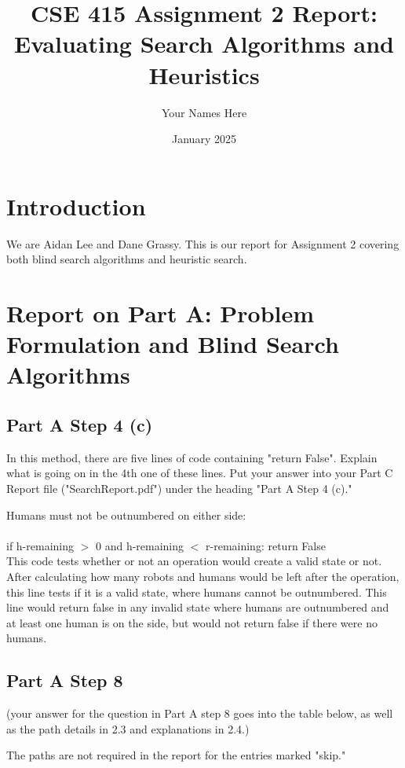 \documentclass{article}
\title{CSE 415 Assignment 2 Report: \\
Evaluating Search Algorithms and Heuristics}
\author{Your Names Here }
\date{January 2025}
\begin{document}
\maketitle

\section{Introduction}
We are Aidan Lee and Dane Grassy. 
This is our report for Assignment 2 covering both blind search algorithms
and heuristic search.

\section{Report on Part A: Problem Formulation and Blind Search Algorithms}

\subsection{Part A Step 4 (c)}
In this method, there are five lines of code containing "return False". Explain what is going on in the 4th one of these lines. Put your answer into your Part C Report file ("SearchReport.pdf") under the heading "Part A Step 4 (c)."

Humans must not be outnumbered on either side:
\\
\\ if h-remaining $>$ 0 and h-remaining $<$ r-remaining: return False
\\ This code tests whether or not an operation would create a valid state or not. After calculating how many robots and humans would be left after the operation, this line tests if it is a valid state, where humans cannot be outnumbered. This line would return false in any invalid state where humans are outnumbered and at least one human is on the side, but would not return false if there were no humans. 



\subsection{Part A Step 8}

(your answer for the question in Part A step 8 goes into the table below, as
well as the path details in 2.3 and explanations in 2.4.)

The paths are not required in the report for the entries marked "skip."
\end{document}
